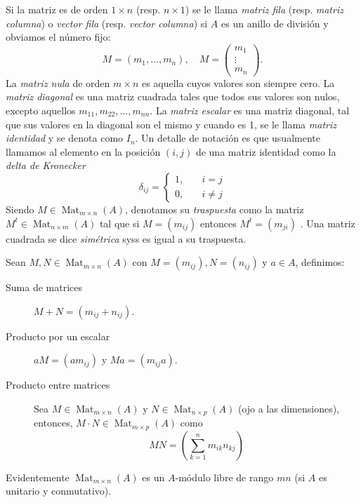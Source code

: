 \documentclass[11pt,oneside]{book}
\DeclareMathOperator{\Mat}{Mat}
\begin{document}
\begin{mydef}[Matriz]
Si la matriz es de orden $1\times n$ (resp. $n\times 1$) se le llama \textit{matriz fila} (resp. \textit{matriz columna}) o \textit{vector fila} (resp. \textit{vector columna}) si $A$ es un anillo de división y obviamos el número fijo:
$$M=(m_1,\dots,m_n),\quad M=\begin{pmatrix}
m_1 \\ \vdots \\ m_n
\end{pmatrix}.$$
La \textit{matriz nula} de orden $m\times n$ es aquella cuyos valores son siempre cero. La \textit{matriz diagonal} es una matriz cuadrada tales que todos sus valores son nulos, excepto aquellos $m_{11},m_{22},\dots,m_{nn}$. La \textit{matriz escalar} es una matriz diagonal, tal que sus valores en la diagonal son el mismo y cuando es 1, se le llama \textit{matriz identidad} y se denota como $I_n$. Un detalle de notación es que usualmente llamamos al elemento en la posición $(i,j)$ de una matriz identidad como la \textit{delta de Kronecker}
$$\delta_{ij}=\begin{cases}
1,&\quad i=j\\
0,&\quad i\neq j
\end{cases}$$ 
Siendo $M\in\Mat_{m\times n}(A)$, denotamos su \textit{traspuesta} como la matriz $M^t\in\Mat_{n\times m}(A)$ tal que si $M=(m_{ij})$ entonces $M^t=(m_{ji})$ . Una matriz cuadrada se dice \textit{simétrica} syss es igual a su traspuesta.

Sean $M,N\in\Mat_{m\times n}(A)$ con $M=(m_{ij}), N=(n_{ij})$ y $a\in A$, definimos:
\begin{description}
	\item[Suma de matrices] $M+N=(m_{ij}+n_{ij})$.
	\item[Producto por un escalar] $aM=(am_{ij})$ y $Ma=(m_{ij}a)$.
	\item[Producto entre matrices] Sea $M\in\Mat_{m\times n}(A)$ y $N\in\Mat_{n\times p}(A)$ (ojo a las dimensiones), entonces, $M\cdot N\in\Mat_{m\times p}(A)$ como
	$$MN=\left(\sum_{k=1}^n m_{ik}n_{kj}\right)$$
\end{description}
\end{mydef}
Evidentemente $\Mat_{m\times n}(A)$ es un $A$-módulo libre de rango $mn$ (si $A$ es unitario y conmutativo).
\end{document}
